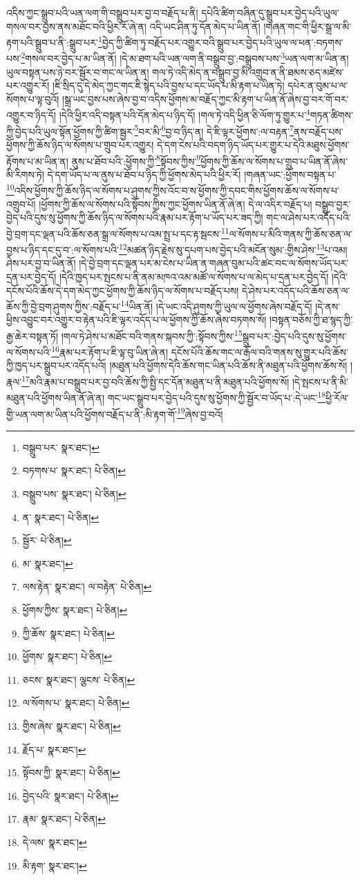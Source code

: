 འདིས་ཀྱང་སྒྲུབ་པའི་ཡན་ལག་གི་བསྒྲུབ་པར་བྱ་བ་བརྗོད་པ་ནི། དཔེའི་ཚིག་བཞིན་དུ་སྒྲུབ་པར་བྱེད་པའི་ཡུལ་གསལ་བར་བྱས་ནས་མཐོང་བའི་ཕྱིར་རོ་ཞེ་ན། འདི་ཡང་ཤིན་ཏུ་དོན་མེད་པ་ཡིན་ནོ། །གཞན་གང་གི་ཕྱིར་སྒྲ་ལ་མི་རྟག་པའི་སྒྲུབ་པ་ནི་:སྒྲུབ་པར་\footnote{བསྒྲུབ་པར་  སྣར་ཐང་། }བྱེད་ཀྱི་ཚིག་ཏུ་བརྗོད་པར་འགྱུར་བའི་སྒྲུབ་པར་བྱེད་པའི་ཡུལ་ལ་ཕན་:བཏགས་པས་\footnote{བཏགས་པ་  སྣར་ཐང་།  པེ་ཅིན། }གསལ་བར་བྱེད་པ་མ་ཡིན་ནོ། །དེ་མ་ཐག་པའི་ཡན་ལག་ནི་བསྒྲུབ་བྱ་:བསྒྲུབས་པས་\footnote{བསྒྲུབ་པས་  སྣར་ཐང་།  པེ་ཅིན། }ཡན་ལག་མ་ཡིན་ན། ཡུལ་བསྟན་པས་ཉེ་བར་སྦྱོར་བ་གང་ལ་ཡིན་ན། གལ་ཏེ་འདི་མེད་ན་བསྒྲུབ་བྱ་མི་འགྲུབ་ན་ནི་ཐམས་ཅད་མཛེས་པར་འགྱུར་རོ། །ཇི་སྲིད་དུ་དེ་མེད་ཀྱང་གང་ཇི་སྙེད་པའི་བྱས་པ་དང་ཡོད་པ་མི་རྟག་པ་ཡིན་ཏེ། དཔེར་ན་བུམ་པ་ལ་སོགས་པ་ལྟ་བུའོ། །སྒྲ་ཡང་བྱས་པས་ཞེས་བྱ་བ་འདིས་ཕྱོགས་མ་བརྗོད་ཀྱང་མི་རྟག་པ་ཡིན་ནོ་ཞེས་བྱ་བར་གོ་བར་འགྱུར་བ་ཉིད་དོ། །དེའི་ཕྱིར་འདི་བསྟན་པའི་དོན་མེད་པ་ཉིད་དོ། །གལ་ཏེ་འདི་ཕྱིན་ཅི་ལོག་ཏུ་གྱུར་པ་\footnote{ན་  སྣར་ཐང་།  པེ་ཅིན། }གཏན་ཚིགས་ཀྱི་བྱེད་པའི་ཡུལ་སྟོན་ཕྱོགས་ཀྱི་ཚིག་སྦྱར་\footnote{སྦྱོར་  པེ་ཅིན། }བར་མི་\footnote{མ་  སྣར་ཐང་། }བྱ་བ་ཉིད་ན། དེ་ཇི་ལྟར་ཕྱོགས་:ལ་བརྟན་\footnote{ལས་རྟེན་  སྣར་ཐང་། ལ་བརྟེན་  པེ་ཅིན། }ནས་བརྗོད་པས་ཕྱོགས་ཀྱི་ཆོས་ཉིད་ལ་སོགས་པ་གྲུབ་པར་འགྱུར། དེ་དག་ངེས་པའི་བདག་ཉིད་ཡོད་པར་གྱུར་པ་དེའི་མཐུས་ཕྱོགས་རྟོགས་པ་མ་ཡིན་ན། ནུས་པ་ཐོབ་པའི་:ཕྱོགས་ཀྱི་\footnote{ཕྱོགས་ཀྱིས་  སྣར་ཐང་།  པེ་ཅིན། }སྟོབས་ཀྱིས་\footnote{ཀྱི་ཆོས་  སྣར་ཐང་།  པེ་ཅིན། }ཕྱོགས་ཀྱི་ཆོས་ལ་སོགས་པ་གྲུབ་པ་ཡིན་ནོ་ཞེས་མི་རིགས་ཏེ། དེ་དག་ཡོད་པ་ལ་ནུས་པ་ཐོབ་པ་ཉིད་ཀྱི་ཕྱོགས་མེད་པའི་ཕྱིར་རོ། །གཞན་ཡང་:ཕྱོགས་བསྟན་པ་\footnote{ཕྱོགས་  སྣར་ཐང་།  པེ་ཅིན། }འདིས་ཕྱོགས་ཀྱི་ཆོས་ཉིད་ལ་སོགས་པ་ཤུགས་ཀྱིས་འོང་བ་ས་ཕྱོགས་ཀྱི་དབང་གིས་ཕྱོགས་ཆོས་ལ་སོགས་པ་འགྲུབ་པོ། །ཕྱོགས་ཀྱི་ཆོས་ལ་སོགས་པའི་སྟོབས་ཀྱིས་ཀྱང་ཕྱོགས་ཡིན་ནོ་ཞེ་ན། དེ་ལ་འདིར་བརྗོད་པ། བསྒྲུབ་བྱར་བྱེད་པའི་དུས་སུ་ཕྱོགས་ཀྱི་ཆོས་ཉིད་ལ་སོགས་པའི་རྣམ་པར་རྟོག་པ་ཡོད་པར་ཟད་ཀྱི། གང་ལ་ཤེས་པར་འདོད་པའི་བྱེ་བྲག་དང་ལྡན་པའི་ཆོས་ཅན་སྒྲ་ལ་སོགས་པ་འམ་སྤྲ་པ་དང་རྟ་སྦངས་\footnote{ཅངས་  སྣར་ཐང་། ལྕངས་  པེ་ཅིན། }ལ་སོགས་པ་མིའི་གནས་ཀྱི་ཆོས་ཅན་ལ་བྱས་པ་ཉིད་དང་དུ་བ་:ལ་སོགས་པའི་\footnote{ལ་སོགས་པ་  སྣར་ཐང་།  པེ་ཅིན། }མཚན་ཉིད་རྗེས་སུ་དཔག་པས་བྱེད་པའི་མངོན་སུམ་:གྱིས་ཤེས་\footnote{གྱིས་ཞེས་  སྣར་ཐང་།  པེ་ཅིན། }པ་འམ། ཤེས་པར་བྱ་བ་ཡིན་ནོ། །དེ་བྱེ་བྲག་དང་ལྡན་པར་མ་ངེས་པ་ཡིན་ན་གཞན་བུམ་པའི་ཚང་བང་ལ་སོགས་ཡོད་པར་དྲན་པར་བྱེད་དོ། །དེའི་ཁྱད་པར་སྤངས་པ་ནི་ནམ་མཁའ་འམ་མཚོ་ལ་སོགས་པ་ལ་མེད་པ་དྲན་པར་བྱེད་དོ། །དེའི་དངོས་པོའི་ཆོས་དེ་དག་མེད་ཀྱང་ཕྱོགས་ཀྱི་ཆོས་ཉིད་ལ་སོགས་པ་བརྗོད་པས། དེ་ཤེས་པར་འདོད་པའི་ཆོས་ཅན་ལ་ཆོས་ཀྱི་བྱེ་བྲག་ཤུགས་ཀྱིས་:བརྗོད་པ་\footnote{རྗོད་པ་  སྣར་ཐང་། }ཡིན་ནོ། །དེ་ཡང་འདི་ཤུགས་ཀྱི་ཡུལ་ལ་ཕྱོགས་ཞེས་བརྗོད་དོ། །དེ་ནས་ཕྱིས་འབྱུང་བར་འགྱུར་བ་རྟེན་པའི་ཇི་ལྟར་འདོད་པ་ལ་ཕྱོགས་ཀྱི་ཆོས་ཞེས་བཏགས་སོ། །བསྟན་བཅོས་ཀྱི་ཐ་སྙད་ཀྱི་རྒྱ་ཆེར་བསྟན་ཏོ། །གལ་ཏེ་ཤེས་པ་མཐོང་བའི་གནས་སྐབས་ཀྱི་:སྟོབས་ཀྱིས་\footnote{སྟོབས་ཀྱི་  སྣར་ཐང་།  པེ་ཅིན། }སྒྲུབ་པར་:བྱེད་པའི་དུས་སུ་ཕྱོགས་ལ་སོགས་པའི་\footnote{བྱེད་པའི་  སྣར་ཐང་།  པེ་ཅིན། }རྣམ་པར་རྟོག་པ་ཇི་ལྟ་བུ་ཡིན་ཞེ་ན། དངོས་པོའི་ཆོས་གང་ལ་རྒོལ་བའི་གནས་སུ་གྱུར་པའི་ཆོས་ཀྱི་ཁྱད་པར་སྒྲུབ་པར་འདོད་པའོ། །མཐུན་པའི་ཕྱོགས་དེའི་ཆོས་གང་ཡིན་པའི་ཆོས་ནི་མཐུན་པའི་ཕྱོགས་ཆོས་སོ། །རྣལ་\footnote{རྣམ་  སྣར་ཐང་།  པེ་ཅིན། }མའི་རྣམ་པ་བསྒྲུབ་པར་བྱ་བའི་ཆོས་ཀྱི་སྤྱི་དང་དོན་མཐུན་པ་ནི་མཐུན་པའི་ཕྱོགས་སོ། །དེ་སྤངས་པ་ནི་མི་མཐུན་པའི་ཕྱོགས་ཡིན་ནོ་ཞེ་ན། གང་ཡང་སྒྲུབ་པར་བྱེད་པའི་དུས་སུ་ཕྱོགས་ཀྱི་སྦྱོར་བ་ཡོད་པ་:དེ་ཡང་\footnote{དེ་ལས་  སྣར་ཐང་། }ཕྱི་རོལ་གྱི་ཡན་ལག་མ་ཡིན་པའི་ཕྱོགས་བརྗོད་པ་ནི་:མི་རྟག་གོ་\footnote{མི་རྟག་  སྣར་ཐང་། }ཞེས་བྱ་བའོ། 